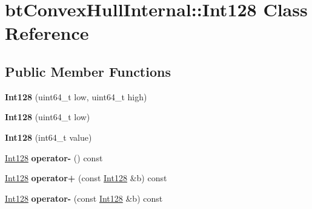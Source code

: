 \hypertarget{classbt_convex_hull_internal_1_1_int128}{\section{bt\+Convex\+Hull\+Internal\+:\+:Int128 Class Reference}
\label{classbt_convex_hull_internal_1_1_int128}
}
\subsection*{Public Member Functions}
\begin{DoxyCompactItemize}
\item 
\hypertarget{classbt_convex_hull_internal_1_1_int128_a714477e7d4f4fc797e840b31140caaea}{{\bfseries Int128} (uint64\+\_\+t low, uint64\+\_\+t high)}\label{classbt_convex_hull_internal_1_1_int128_a714477e7d4f4fc797e840b31140caaea}

\item 
\hypertarget{classbt_convex_hull_internal_1_1_int128_a2091782037196f33f46b7ce4e1a4383a}{{\bfseries Int128} (uint64\+\_\+t low)}\label{classbt_convex_hull_internal_1_1_int128_a2091782037196f33f46b7ce4e1a4383a}

\item 
\hypertarget{classbt_convex_hull_internal_1_1_int128_abdea99e53056edaac085faea14e5be9a}{{\bfseries Int128} (int64\+\_\+t value)}\label{classbt_convex_hull_internal_1_1_int128_abdea99e53056edaac085faea14e5be9a}

\item 
\hypertarget{classbt_convex_hull_internal_1_1_int128_a0dfa90d582f1f9c6eb1a0dd249b177e3}{\hyperlink{classbt_convex_hull_internal_1_1_int128}{Int128} {\bfseries operator-\/} () const }\label{classbt_convex_hull_internal_1_1_int128_a0dfa90d582f1f9c6eb1a0dd249b177e3}

\item 
\hypertarget{classbt_convex_hull_internal_1_1_int128_a3c9b61c095aea543ea30565bb4457d41}{\hyperlink{classbt_convex_hull_internal_1_1_int128}{Int128} {\bfseries operator+} (const \hyperlink{classbt_convex_hull_internal_1_1_int128}{Int128} \&b) const }\label{classbt_convex_hull_internal_1_1_int128_a3c9b61c095aea543ea30565bb4457d41}

\item 
\hypertarget{classbt_convex_hull_internal_1_1_int128_ab878fc7e210a94f06805fc7f596beb73}{\hyperlink{classbt_convex_hull_internal_1_1_int128}{Int128} {\bfseries operator-\/} (const \hyperlink{classbt_convex_hull_internal_1_1_int128}{Int128} \&b) const }\label{classbt_convex_hull_internal_1_1_int128_ab878fc7e210a94f06805fc7f596beb73}


\end{DoxyCompactItemize}
